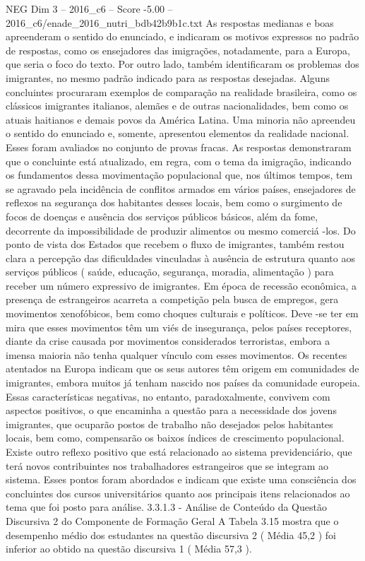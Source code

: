 \begin{textsample}{NEG Dim 3 – 2016\_c6 – Score -5.00 – 2016\_c6/enade\_2016\_nutri\_bdb42b9b1c.txt}
As respostas medianas e boas apreenderam o sentido do enunciado, e indicaram os motivos expressos no padrão de respostas, como os ensejadores das imigrações, notadamente, para a Europa, que seria o foco do texto.
Por outro lado, também identificaram os problemas dos imigrantes, no mesmo padrão indicado para as respostas desejadas.
Alguns concluintes procuraram exemplos de comparação na realidade brasileira, como os clássicos imigrantes italianos, alemães e de outras nacionalidades, bem como os atuais haitianos e demais povos da América Latina.
Uma minoria não apreendeu o sentido do enunciado e, somente, apresentou elementos da realidade nacional.
Esses foram avaliados no conjunto de provas fracas.
As respostas demonstraram que o concluinte está atualizado, em regra, com o tema da imigração, indicando os fundamentos dessa movimentação populacional que, nos últimos tempos, tem se agravado pela incidência de conflitos armados em vários países, ensejadores de reflexos na segurança dos habitantes desses locais, bem como o surgimento de focos de doenças e ausência dos serviços públicos básicos, além da fome, decorrente da impossibilidade de produzir alimentos ou mesmo comerciá -los.
Do ponto de vista dos Estados que recebem o fluxo de imigrantes, também restou clara a percepção das dificuldades vinculadas à ausência de estrutura quanto aos serviços públicos ( saúde, educação, segurança, moradia, alimentação ) para receber um número expressivo de imigrantes.
Em época de recessão econômica, a presença de estrangeiros acarreta a competição pela busca de empregos, gera movimentos xenofóbicos, bem como choques culturais e políticos.
Deve -se ter em mira que esses movimentos têm um viés de insegurança, pelos países receptores, diante da crise causada por movimentos considerados terroristas, embora a imensa maioria não tenha qualquer vínculo com esses movimentos.
Os recentes atentados na Europa indicam que os seus autores têm origem em comunidades de imigrantes, embora muitos já tenham nascido nos países da comunidade europeia.
Essas características negativas, no entanto, paradoxalmente, convivem com aspectos positivos, o que encaminha a questão para a necessidade dos jovens imigrantes, que ocuparão postos de trabalho não desejados pelos habitantes locais, bem como, compensarão os baixos índices de crescimento populacional.
Existe outro reflexo positivo que está relacionado ao sistema previdenciário, que terá novos contribuintes nos trabalhadores estrangeiros que se integram ao sistema.
Esses pontos foram abordados e indicam que existe uma consciência dos concluintes dos cursos universitários quanto aos principais itens relacionados ao tema que foi posto para análise. 3.3.1.3 - Análise de Conteúdo da Questão Discursiva 2 do Componente de Formação Geral A Tabela 3.15 mostra que o desempenho médio dos estudantes na questão discursiva 2 ( Média 45,2 ) foi inferior ao obtido na questão discursiva 1 ( Média 57,3 ).

\end{textsample}

